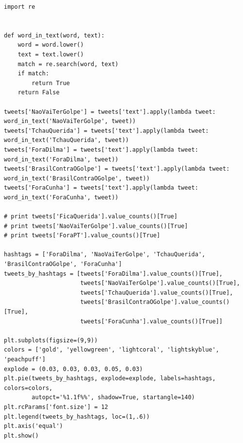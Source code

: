 \begin{lstlisting}
import re


def word_in_text(word, text):
    word = word.lower()
    text = text.lower()
    match = re.search(word, text)
    if match:
        return True
    return False

tweets['NaoVaiTerGolpe'] = tweets['text'].apply(lambda tweet: word_in_text('NaoVaiTerGolpe', tweet))
tweets['TchauQuerida'] = tweets['text'].apply(lambda tweet: word_in_text('TchauQuerida', tweet))
tweets['ForaDilma'] = tweets['text'].apply(lambda tweet: word_in_text('ForaDilma', tweet))
tweets['BrasilContraOGolpe'] = tweets['text'].apply(lambda tweet: word_in_text('BrasilContraOGolpe', tweet))
tweets['ForaCunha'] = tweets['text'].apply(lambda tweet: word_in_text('ForaCunha', tweet))

# print tweets['FicaQuerida'].value_counts()[True]
# print tweets['NaoVaiTerGolpe'].value_counts()[True]
# print tweets['ForaPT'].value_counts()[True]

hashtags = ['ForaDilma', 'NaoVaiTerGolpe', 'TchauQuerida', 'BrasilContraOGolpe', 'ForaCunha']
tweets_by_hashtags = [tweets['ForaDilma'].value_counts()[True],
                      tweets['NaoVaiTerGolpe'].value_counts()[True],
                      tweets['TchauQuerida'].value_counts()[True],
                      tweets['BrasilContraOGolpe'].value_counts()[True],
                      tweets['ForaCunha'].value_counts()[True]]

plt.subplots(figsize=(9,9))
colors = ['gold', 'yellowgreen', 'lightcoral', 'lightskyblue', 'peachpuff']
explode = (0.03, 0.03, 0.03, 0.05, 0.03)
plt.pie(tweets_by_hashtags, explode=explode, labels=hashtags, colors=colors,
        autopct='%1.1f%%', shadow=True, startangle=140)
plt.rcParams['font.size'] = 12
plt.legend(tweets_by_hashtags, loc=(1,.6))
plt.axis('equal')
plt.show()
\end{lstlisting}


































